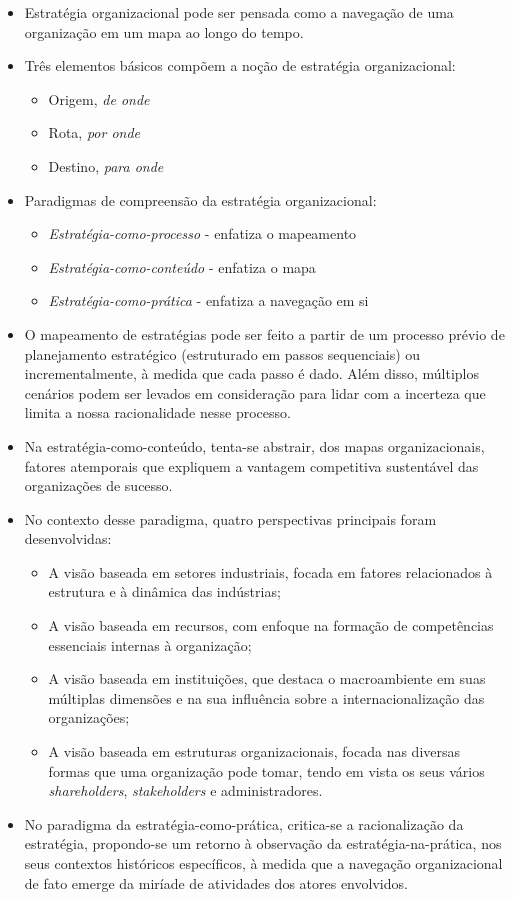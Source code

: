 \documentclass{article}
\begin{document}
\begin{itemize}
    \item Estratégia organizacional pode ser pensada como a navegação de uma organização em um mapa ao longo do tempo.
    \item Três elementos básicos compõem a noção de estratégia organizacional:
    \begin{itemize}
        \item Origem, \emph{de onde}
        \item Rota, \emph{por onde}
        \item Destino, \emph{para onde}
    \end{itemize}
    \item Paradigmas de compreensão da estratégia organizacional:
    \begin{itemize}
        \item \emph{Estratégia-como-processo} - enfatiza o mapeamento
        \item \emph{Estratégia-como-conteúdo} - enfatiza o mapa
        \item \emph{Estratégia-como-prática} - enfatiza a navegação em si
    \end{itemize}
    \item O mapeamento de estratégias pode ser feito a partir de um processo prévio de planejamento estratégico (estruturado em passos sequenciais) ou incrementalmente, à medida que cada passo é dado. Além disso, múltiplos cenários podem ser levados em consideração para lidar com a incerteza que limita a nossa racionalidade nesse processo.
    \item Na estratégia-como-conteúdo, tenta-se abstrair, dos mapas organizacionais, fatores atemporais que expliquem a vantagem competitiva sustentável das organizações de sucesso.
    \item No contexto desse paradigma, quatro perspectivas principais foram desenvolvidas: 
    \begin{itemize}
        \item A visão baseada em setores industriais, focada em fatores relacionados à estrutura e à dinâmica das indústrias; 
        \item A visão baseada em recursos, com enfoque na formação de competências essenciais internas à organização; 
        \item A visão baseada em instituições, que destaca o macroambiente em suas múltiplas dimensões e na sua influência sobre a internacionalização das organizações; 
        \item A visão baseada em estruturas organizacionais, focada nas diversas formas que uma organização pode tomar, tendo em vista os seus vários \textit{shareholders}, \textit{stakeholders} e administradores.
    \end{itemize}
    \item No paradigma da estratégia-como-prática, critica-se a racionalização da estratégia, propondo-se um retorno à observação da estratégia-na-prática, nos seus contextos históricos específicos, à medida que a navegação organizacional de fato emerge da miríade de atividades dos atores envolvidos.
\end{itemize}
\end{document}
